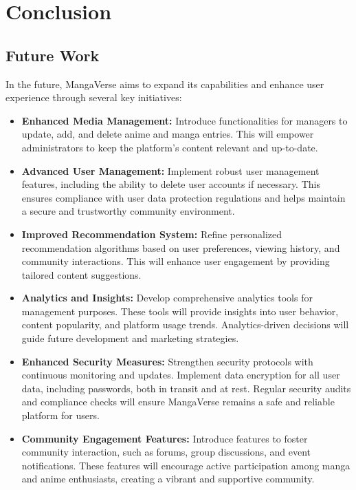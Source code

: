 \chapter{Conclusion}


\section{Future Work}

In the future, MangaVerse aims to expand its capabilities and enhance user experience through several key initiatives:

\begin{itemize}
\item \textbf{Enhanced Media Management:} Introduce functionalities for managers to update, add, and delete anime and manga entries. 
This will empower administrators to keep the platform's content relevant and up-to-date.

\item \textbf{Advanced User Management:} Implement robust user management features, including the ability to delete user accounts 
if necessary. This ensures compliance with user data protection regulations and helps maintain a secure and trustworthy 
community environment.

\item \textbf{Improved Recommendation System:} Refine personalized recommendation algorithms based on user preferences, 
viewing history, and community interactions. This will enhance user engagement by providing tailored content suggestions.

\item \textbf{Analytics and Insights:} Develop comprehensive analytics tools for management purposes. These tools will provide 
insights into user behavior, content popularity, and platform usage trends. Analytics-driven decisions will guide future 
development and marketing strategies.

\item \textbf{Enhanced Security Measures:} Strengthen security protocols with continuous monitoring and updates. Implement 
data encryption for all user data, including passwords, both in transit and at rest. Regular security audits and compliance 
checks will ensure MangaVerse remains a safe and reliable platform for users.

\item \textbf{Community Engagement Features:} Introduce features to foster community interaction, such as forums, group 
discussions, and event notifications. These features will encourage active participation among manga and anime enthusiasts, 
creating a vibrant and supportive community.
\end{itemize}

